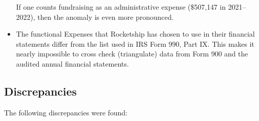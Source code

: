 \begin{itemize}
  If one counts fundraising as an administrative expense (\$507,147 in 2021–2022), then the anomaly is even more pronounced.

  \item The functional Expenses that Rocketship has chosen to use in their financial statements differ from the list used in IRS Form 990, Part IX. This makes it nearly impossible to cross check (triangulate) data from Form 900 and the audited annual financial statements.
\end{itemize}

\subsection{Discrepancies}\indent%
\label{sec:discrepancies}

The following discrepancies were found:
